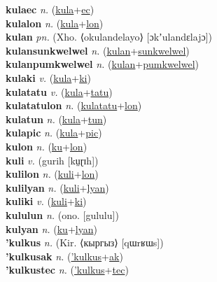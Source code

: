 \textbf{kulaec} \textit{n.} (\hyperref[kula]{kula}+\hyperref[ec]{ec})
 \label{kulaec} \\
\textbf{kulalon} \textit{n.} (\hyperref[kula]{kula}+\hyperref[lon]{lon})
 \label{kulalon} \\
\textbf{kulan} \textit{pn.} (Xho. ⟨okulandelayo⟩ [ɔkʼulandɛlajɔ])
 \label{kulan} \\
\textbf{kulansunkwelwel} \textit{n.} (\hyperref[kulan]{kulan}+\hyperref[sunkwelwel]{sunkwelwel})
 \label{kulansunkwelwel} \\
\textbf{kulanpumkwelwel} \textit{n.} (\hyperref[kulan]{kulan}+\hyperref[pumkwelwel]{pumkwelwel})
 \label{kulanpumkwelwel} \\
\textbf{kulaki} \textit{v.} (\hyperref[kula]{kula}+\hyperref[ki]{ki})
 \label{kulaki} \\
\textbf{kulatatu} \textit{v.} (\hyperref[kula]{kula}+\hyperref[tatu]{tatu})
 \label{kulatatu} \\
\textbf{kulatatulon} \textit{n.} (\hyperref[kulatatu]{kulatatu}+\hyperref[lon]{lon})
 \label{kulatatulon} \\
\textbf{kulatun} \textit{n.} (\hyperref[kula]{kula}+\hyperref[tun]{tun})
 \label{kulatun} \\
\textbf{kulapic} \textit{n.} (\hyperref[kula]{kula}+\hyperref[pic]{pic})
 \label{kulapic} \\
\textbf{kulon} \textit{n.} (\hyperref[ku]{ku}+\hyperref[lon]{lon})
 \label{kulon} \\
\textbf{kuli} \textit{v.} ({\javanese{}gurih} [kṳɽɪh])
 \label{kuli} \\
\textbf{kulilon} \textit{n.} (\hyperref[kuli]{kuli}+\hyperref[lon]{lon})
 \label{kulilon} \\
\textbf{kulilyan} \textit{n.} (\hyperref[kuli]{kuli}+\hyperref[lyan]{lyan})
 \label{kulilyan} \\
\textbf{kuliki} \textit{v.} (\hyperref[kuli]{kuli}+\hyperref[ki]{ki})
 \label{kuliki} \\
\textbf{kululun} \textit{n.} (ono. [gululu])
 \label{kululun} \\
\textbf{kulyan} \textit{n.} (\hyperref[ku]{ku}+\hyperref[lyan]{lyan})
 \label{kulyan} \\
\textbf{'kulkus} \textit{n.} (Kir. ⟨кыргыз⟩ [qɯrʁɯs])
 \label{'kulkus} \\
\textbf{'kulkusak} \textit{n.} (\hyperref['kulkus]{'kulkus}+\hyperref[ak]{ak})
 \label{'kulkusak} \\
\textbf{'kulkustec} \textit{n.} (\hyperref['kulkus]{'kulkus}+\hyperref[tec]{tec})

